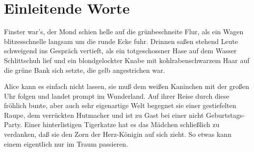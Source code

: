 \documentclass[12pt]{scrreprt}
\begin{document}
\section{Einleitende Worte}
Finster war's, der Mond schien helle auf die grünbeschneite Flur, als
ein Wagen blitzesschnelle langsam um die runde Ecke fuhr. Drinnen
saßen stehend Leute schweigend ins Gespräch vertieft, als ein
totgeschossner Hase auf dem Wasser Schlittschuh lief und ein
blondgelockter Knabe mit kohlrabenschwarzem Haar auf die grüne Bank
sich setzte, die gelb angestrichen war.

Alice kann es einfach nicht lassen, sie muß dem weißen Kaninchen mit
der großen Uhr folgen und landet prompt im Wunderland. Auf ihrer Reise
durch diese fröhlich bunte, aber auch sehr eigenartige Welt begegnet
sie einer gestiefelten Raupe, dem verrückten Hutmacher und ist zu Gast
bei einer nicht Geburtstags-Party. Einer hinterlistigen Tigerkatze hat
es das Mädchen schließlich zu verdanken, daß sie den Zorn der
Herz-Königin auf sich zieht. So etwas kann einem eigentlich nur im
Traum passieren.
\end{document}
